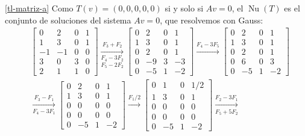 \begin{enumerate}[topsep=6pt, itemsep=.4cm]
    \ref{tl-matriz-a}  Como $T(v) = (0,0,0,0,0)$ si y solo si $Av=0$, el $\operatorname{Nu}(T)$ es el conjunto de soluciones del sistema $Av=0$,  que resolvemos  con Gauss:
    \begin{align*}
        &\begin{bmatrix}
            0 & 2 & 0 &1\\
            1 & 3 & 0 &1\\
            -1 &-1 &0 &0\\
            3 &0 &3 &0\\
            2 &1 &1 &0
        \end{bmatrix}
        \underset{F_5-2F_2}{\underset{F_4-3F_2}{\stackrel{F_3+F_2}{\longrightarrow}}}
        \begin{bmatrix}
            0 & 2 & 0 &1\\
            1 & 3 & 0 &1\\
            0 &2 &0 &1\\
            0 &-9 &3 &-3\\
            0 &-5 &1 &-2
        \end{bmatrix}
        \stackrel{F_4-3F_5}{\longrightarrow}
        \begin{bmatrix}
            0 & 2 & 0 &1\\
            1 & 3 & 0 &1\\
            0 &2 &0 &1\\
            0 &6 &0 &3\\
            0 &-5 &1 &-2
        \end{bmatrix} \\
        &\underset{F_4-3F_1}{\stackrel{F_3-F_1}{\longrightarrow}}
        \begin{bmatrix}
            0 & 2 & 0 &1\\
            1 & 3 & 0 &1\\
            0 &0 &0 &0\\
            0 &0 &0 &0\\
            0 &-5 &1 &-2
        \end{bmatrix}
        \stackrel{F_1/2}{\longrightarrow}
        \begin{bmatrix}
            0 & 1 & 0 &1/2\\
            1 & 3 & 0 &1\\
            0 &0 &0 &0\\
            0 &0 &0 &0\\
            0 &-5 &1 &-2
        \end{bmatrix}
        \underset{F_5+5F_2}{\stackrel{F_2-3F_1}{\longrightarrow}}

\end{align*}
\end{enumerate}
